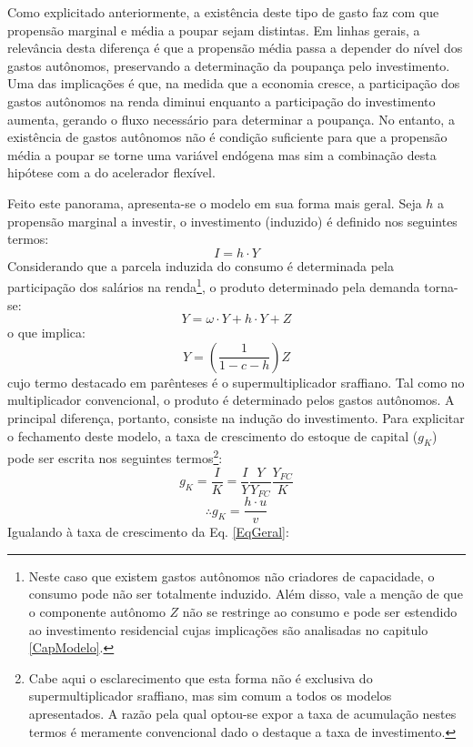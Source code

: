 Como explicitado anteriormente, a existência deste tipo de gasto faz com que propensão marginal e média a poupar sejam distintas. Em linhas gerais, a relevância desta diferença é que a propensão média passa a depender do nível dos gastos autônomos, preservando a determinação da poupança pelo investimento.  Uma das implicações é que, na medida que a economia cresce, a participação dos gastos autônomos na renda diminui enquanto a participação do investimento aumenta, gerando o fluxo necessário para determinar a poupança. 
No entanto, a existência de gastos autônomos não é condição suficiente para que a propensão média a poupar se torne uma variável endógena mas sim a combinação desta hipótese com a do acelerador flexível.

Feito este panorama, apresenta-se o modelo em sua forma mais geral.
Seja $h$ a propensão marginal a investir, o investimento (induzido) é definido nos seguintes termos:
$$
I = h\cdot Y
$$
Considerando que a parcela induzida do consumo é determinada pela participação dos salários  na renda\footnote{Neste caso que existem gastos autônomos não criadores de capacidade, o consumo pode não ser totalmente induzido. Além disso, vale a menção de que o componente autônomo $Z$ não se restringe ao consumo e pode ser estendido ao investimento residencial cujas implicações são analisadas no capitulo \ref{CapModelo}.}, o produto determinado pela demanda torna-se:
\begin{equation}
\label{PIBSuper}
    Y = \omega\cdot Y + h\cdot Y + Z
\end{equation}
o que implica:
\begin{equation}
\label{Supermultiplicador}
Y = \left(\frac{1}{1 - c - h}\right)Z
\end{equation}
cujo termo destacado em parênteses é o supermultiplicador sraffiano. Tal como no multiplicador convencional, o produto é determinado pelos gastos autônomos. A principal diferença, portanto, consiste na indução do investimento. Para explicitar o fechamento deste modelo, a taxa de crescimento do estoque de capital ($g_K$) pode ser escrita nos seguintes termos\footnote{Cabe aqui o esclarecimento que esta forma não é exclusiva do supermultiplicador sraffiano, mas sim comum a todos os modelos apresentados. A razão pela qual optou-se expor a taxa de acumulação nestes termos é meramente convencional dado o destaque a taxa de investimento.}:
$$
g_K = \frac{I}{K} = \frac{I}{Y}\frac{Y}{Y_{FC}}\frac{Y_{FC}}{K}
$$
$$
\therefore g_K = \frac{h\cdot u}{v}
$$
Igualando à taxa de crescimento da Eq. \ref{EqGeral}:

